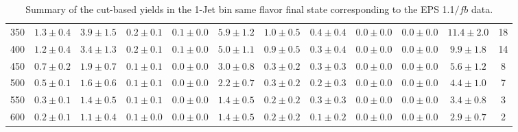 \begin{table}[!hb]
{\begin{center}
\begin{tabular}{l c c c c c c c c c c c }
350 & $1.3\pm0.4$ & $3.9\pm1.5$ & $0.2\pm0.1$ & $0.1\pm0.0$ & $5.9\pm1.2$ & $1.0\pm0.5$ & $0.4\pm0.4$ & $0.0\pm0.0$ & $0.0\pm0.0$ & $11.4\pm2.0$ & 18 \\
400 & $1.2\pm0.4$ & $3.4\pm1.3$ & $0.2\pm0.1$ & $0.1\pm0.0$ & $5.0\pm1.1$ & $0.9\pm0.5$ & $0.3\pm0.4$ & $0.0\pm0.0$ & $0.0\pm0.0$ & $9.9\pm1.8$ & 14 \\
450 & $0.7\pm0.2$ & $1.9\pm0.7$ & $0.1\pm0.1$ & $0.0\pm0.0$ & $3.0\pm0.8$ & $0.3\pm0.2$ & $0.3\pm0.3$ & $0.0\pm0.0$ & $0.0\pm0.0$ & $5.6\pm1.2$ & 8 \\
500 & $0.5\pm0.1$ & $1.6\pm0.6$ & $0.1\pm0.1$ & $0.0\pm0.0$ & $2.2\pm0.7$ & $0.3\pm0.2$ & $0.2\pm0.3$ & $0.0\pm0.0$ & $0.0\pm0.0$ & $4.4\pm1.0$ & 7 \\
550 & $0.3\pm0.1$ & $1.4\pm0.5$ & $0.1\pm0.1$ & $0.0\pm0.0$ & $1.4\pm0.5$ & $0.2\pm0.2$ & $0.3\pm0.3$ & $0.0\pm0.0$ & $0.0\pm0.0$ & $3.4\pm0.8$ & 3 \\
600 & $0.2\pm0.1$ & $1.1\pm0.4$ & $0.1\pm0.0$ & $0.0\pm0.0$ & $1.4\pm0.5$ & $0.2\pm0.2$ & $0.1\pm0.2$ & $0.0\pm0.0$ & $0.0\pm0.0$ & $2.9\pm0.7$ & 2 \\
\hline
\end{tabular}
\end{center}
}
\caption{Summary of the cut-based yields in the 1-Jet bin same flavor final state corresponding to the EPS 1.1$/fb$ data.}
\end{table}

